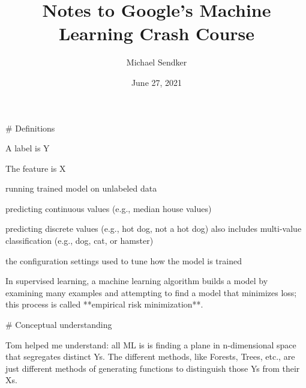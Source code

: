 

\title{Notes to Google's Machine Learning Crash Course}
\author{Michael Sendker}
\date{June 27, 2021}


\begin{markdown}

\maketitle

# Definitions

\begin{definition}[label]
    A label is Y
\end{definition}

\begin{definition}[feature]
    The feature is X
\end{definition}

\begin{definition}[inference]
    running trained model on unlabeled data
\end{definition}

\begin{definition}[regression]
    predicting continuous values (e.g., median house values)
\end{definition}

\begin{definition}[classification]
    predicting discrete values (e.g., hot dog, not a hot dog) also includes
    multi-value classification (e.g., dog, cat, or hamster)
\end{definition}

\begin{definition}[hyperparameters]
    the configuration settings used to tune how the model is trained
\end{definition}

\begin{definition}
    In supervised learning, a machine learning algorithm builds a model by
    examining many examples and attempting to find a model that minimizes loss;
    this process is called **empirical risk minimization**.
\end{definition}

# Conceptual understanding

Tom helped me understand: all ML is is finding a plane in n-dimensional space
that segregates distinct Ys. The different methods, like Forests, Trees, etc.,
are just different methods of generating functions to distinguish those Ys from
their Xs.


\end{markdown}
